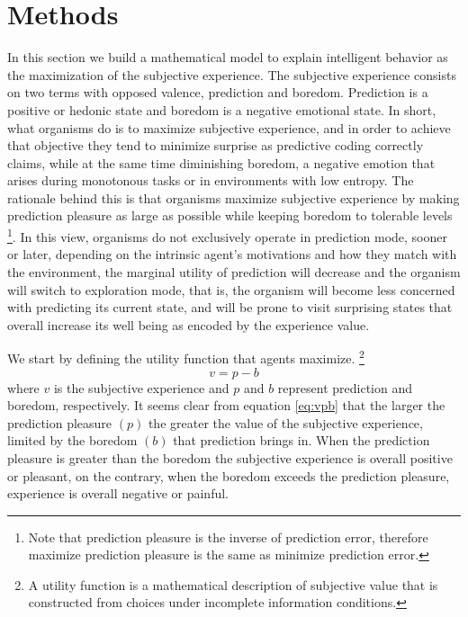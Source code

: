 \documentclass[11pt, onecolumn]{article}
\begin{document}
\section{Methods}
\label{se:methods}

In this section we build a mathematical model to explain intelligent behavior as the maximization of the subjective experience.  %
The subjective experience consists on two terms with opposed valence, prediction and boredom. Prediction is a positive or hedonic state and boredom is a negative emotional state. In short, what organisms do is to maximize subjective experience, and in order to achieve that objective they tend to minimize surprise as predictive coding correctly claims, while at the same time diminishing boredom, a negative emotion that arises during monotonous tasks or in environments with low entropy. The rationale behind this is that organisms maximize subjective experience by making prediction pleasure as large as possible while keeping boredom to tolerable levels \footnote{Note that prediction pleasure is the inverse of prediction error, therefore maximize prediction pleasure is the same as minimize prediction error.}.
In this view, organisms do not exclusively operate in prediction mode, sooner or later, depending on the intrinsic agent's motivations and how they match with the environment, the marginal utility of prediction will decrease and the organism will switch to exploration mode, that is, the organism will become less concerned with predicting its current state, and will be prone to visit surprising states that overall increase its well being as encoded by the experience value. 


We start by defining the utility function that agents maximize. 
\footnote{A utility function is a mathematical description of subjective value that is constructed from choices under incomplete information conditions.} 
\begin{equation}
    v =  p - b
\label{eq:vpb}
\end{equation}
where $v$ is the subjective experience and $p$ and $b$ represent prediction and boredom, respectively. 
It seems clear from equation \ref{eq:vpb} that the larger the prediction pleasure $(p)$ the greater the value of the subjective experience, limited by the boredom $(b)$ that prediction brings in.  
When the prediction pleasure is greater than the boredom the subjective experience is overall positive or pleasant, on the contrary, when the boredom exceeds the prediction pleasure, experience is overall negative or painful. 
\end{document}

